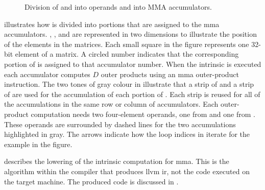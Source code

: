 \documentclass[\main/thesis.tex]{subfiles}
\begin{document}
\begin{figure}[t]
  \caption[Operand and Accumulator Layout in MMA]{Division of  and  into operands and  into MMA accumulators.}
  \label{fig:intrinsic}
\end{figure}

 illustrates how  is divided into portions that are assigned to the \gls{mma} accumulators.
, , and  are represented in two dimensions to illustrate the position of the elements in the matrices.
Each small square in the figure represents one 32-bit element of a matrix.
A circled number indicates that the corresponding portion of  is assigned to that accumulator number.
When the \gls{intrinsic} is executed each accumulator computes $D$ outer products using an \gls{mma} outer-product instruction.
The two tones of gray colour in  illustrate that a strip of  and a strip of  are used for the accumulation of each portion of .
Each strip is reused for all of the accumulations in the same row or column of accumulators.
Each outer-product computation needs two four-element operands, one from  and one from .
These operands are surrounded by dashed lines for the two accumulations highlighted in gray.
The arrows indicate how the loop indices in  iterate for the example in the figure.

 describes the lowering of the \gls{intrinsic} computation for \gls{mma}.
This is the algorithm within the compiler that produces \gls{llvm} \gls{ir}, not the code executed on the target machine.
The produced code is discussed in .
\end{document}
